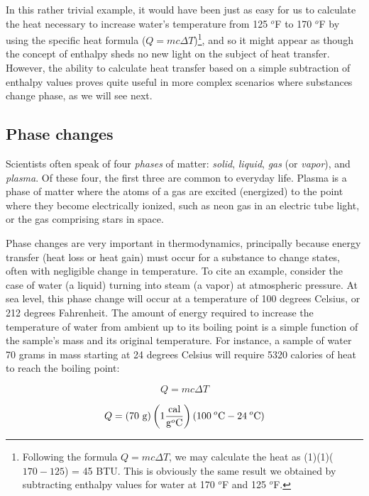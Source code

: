 In this rather trivial example, it would have been just as easy for us to calculate the heat necessary to increase water's temperature from 125 $^{o}$F to 170 $^{o}$F by using the specific heat formula ($Q = mc \Delta T$)\footnote{Following the formula $Q = mc \Delta T$, we may calculate the heat as (1)(1)($170-125$) = 45 BTU.  This is obviously the same result we obtained by subtracting enthalpy values for water at 170 $^{o}$F and 125 $^{o}$F.}, and so it might appear as though the concept of enthalpy sheds no new light on the subject of heat transfer.  However, the ability to calculate heat transfer based on a simple subtraction of enthalpy values proves quite useful in more complex scenarios where substances change phase, as we will see next.







\filbreak
\subsection{Phase changes}

Scientists often speak of four \textit{phases} of matter: \textit{solid}, \textit{liquid}, \textit{gas} (or \textit{vapor}), and \textit{plasma}.  Of these four, the first three are common to everyday life.  Plasma is a phase of matter where the atoms of a gas are excited (energized) to the point where they become electrically ionized, such as neon gas in an electric tube light, or the gas comprising stars in space.

Phase changes are very important in thermodynamics, principally because energy transfer (heat loss or heat gain) must occur for a substance to change states, often with negligible change in temperature.  To cite an example, consider the case of water (a liquid) turning into steam (a vapor) at atmospheric pressure.  At sea level, this phase change will occur at a temperature of 100 degrees Celsius, or 212 degrees Fahrenheit.  The amount of energy required to increase the temperature of water from ambient up to its boiling point is a simple function of the sample's mass and its original temperature.  For instance, a sample of water 70 grams in mass starting at 24 degrees Celsius will require 5320 calories of heat to reach the boiling point:

$$Q = mc \Delta T$$

$$Q = (70 \hbox{ g})\left(1 {\hbox{cal} \over {\hbox{g}^o\hbox{C}}}\right)(100 \> ^o\hbox{C} - 24 \> ^o\hbox{C})$$

